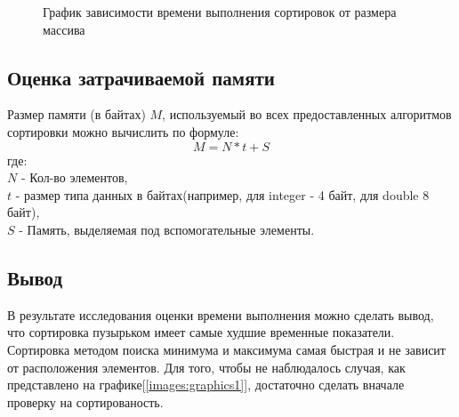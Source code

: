 \documentclass[a4paper,12pt]{article}
\begin{document}
\begin{figure}[H]
\caption{График зависимости времени выполнения сортировок от размера массива}
\label{images:graphics3}
\end{figure}

\newpage
\subsection{Оценка затрачиваемой памяти}
Размер памяти (в байтах) $M$, используемый во всех предоставленных алгоритмов сортировки можно вычислить по формуле:\\
\begin{equation}
M = N * t + S
\end{equation}
где:\\
$N$ - Кол-во элементов,\\
$t$ - размер типа данных в байтах(например, для integer - 4 байт, для double 8 байт),\\
$S$ - Память, выделяемая под вспомогательные элементы.\\

\newpage
\subsection{Вывод}
В результате исследования оценки времени выполнения можно сделать вывод, что сортировка пузырьком имеет самые худшие временные показатели. Сортировка методом поиска минимума и максимума самая быстрая и не зависит от расположения элементов. Для того, чтобы не наблюдалось случая, как представлено на графике[\ref{images:graphics1}], достаточно сделать вначале проверку на сортированость.
\end{document}
